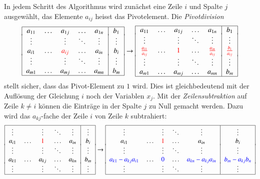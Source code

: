 In jedem Schritt des Algorithmus wird zunächst eine Zeile $i$ und 
Spalte $j$ ausgewählt, das Elemente $a_{ij}$ heisst das Pivotelement.
%
Die {\em Pivotdivision}
\[
\begin{tabular}{|>{$}c<{$}>{$}c<{$}>{$}c<{$}>{$}c<{$}>{$}c<{$}|>{$}c<{$}|}
\hline
a_{11}&\dots &a_{1j}&\dots &a_{1n}&b_1   \\[-2pt]
\vdots&      &\vdots&\ddots&\vdots&\vdots\\
a_{i1}&\dots &{\color{red}a_{ij}}&\dots &a_{in}&b_i   \\[-2pt]
\vdots&      &\vdots&\ddots&\vdots&\vdots\\
a_{m1}&\dots &a_{mj}&\dots &a_{mn}&b_m   \\
\hline
\end{tabular}
\rightarrow
\begin{tabular}{|>{$}c<{$}>{$}c<{$}>{$}c<{$}>{$}c<{$}>{$}c<{$}|>{$}c<{$}|}
\hline
a_{11}&\dots &a_{1j}&\dots &a_{1n}&b_1   \\[-2pt]
\vdots&      &\vdots&\ddots&\vdots&\vdots\\
{\color{red}\frac{a_{i1}}{a_{ij}}}&\dots &{\color{red}1}&\dots &{\color{red}\frac{a_{in}}{a_{ij}}}&{\color{red}\frac{b_i}{a_{ij}}}\\[-2pt]
\vdots&      &\vdots&\ddots&\vdots&\vdots\\
a_{m1}&\dots &a_{mj}&\dots &a_{mn}&b_m   \\
\hline
\end{tabular}
\]
stellt sicher, dass das Pivot-Element zu $1$ wird.
Dies ist gleichbedeutend mit der Auflösung der Gleichung $i$ noch der
Variablen $x_j$.
Mit der {\em Zeilensubtraktion} auf Zeile $k\ne i$ können die Einträge in der
Spalte $j$ zu Null gemacht werden.
Dazu wird das $a_{kj}$-fache der Zeile $i$ von Zeile $k$ subtrahiert:
\[
\begin{tabular}{|>{$}c<{$}>{$}c<{$}>{$}c<{$}>{$}c<{$}>{$}c<{$}|>{$}c<{$}|}
\hline
\vdots&      &\vdots&\ddots&\vdots&\vdots\\
a_{i1}&\dots &{\color{red}1}&\dots &a_{in}&b_i   \\[-2pt]
\vdots&      &\vdots&\ddots&\vdots&\vdots\\
a_{k1}&\dots &a_{kj}&\dots &a_{kn}&b_m   \\[-2pt]
\vdots&      &\vdots&\ddots&\vdots&\vdots\\
\hline
\end{tabular}
\rightarrow
\begin{tabular}{|>{$}c<{$}>{$}c<{$}>{$}c<{$}>{$}c<{$}>{$}c<{$}|>{$}c<{$}|}
\hline
\vdots&      &\vdots&\ddots&\vdots&\vdots\\
a_{i1}&\dots &{\color{red}1}&\dots &a_{in}&b_i   \\[-2pt]
\vdots&      &\vdots&\ddots&\vdots&\vdots\\
{\color{blue}a_{k1}-a_{kj}a_{i1}}&\dots &{\color{blue}0}&\dots &{\color{blue}a_{kn}-a_{kj}a_{in}}&{\color{blue}b_m-a_{kj}b_{n}}\\[-2pt]
\vdots&      &\vdots&\ddots&\vdots&\vdots\\
\hline
\end{tabular}
\]
